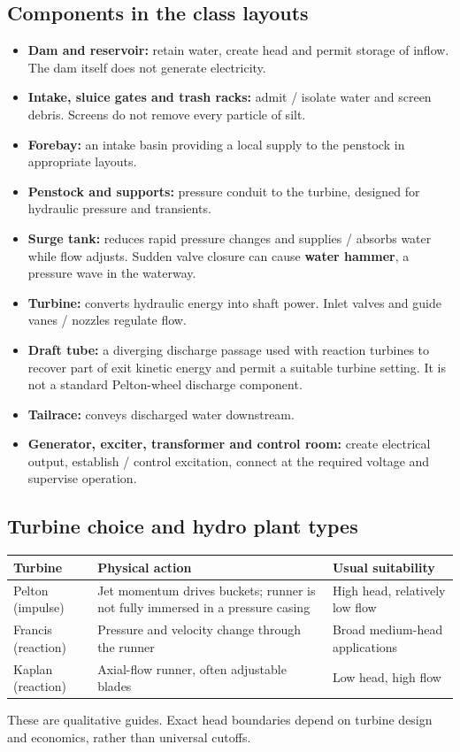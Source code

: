 \documentclass[11pt,a4paper]{article}
\begin{document}
\subsection{Components in the class layouts}
\begin{itemize}
\item \textbf{Dam and reservoir:} retain water, create head and permit storage of inflow. The dam itself does not generate electricity.
\item \textbf{Intake, sluice gates and trash racks:} admit / isolate water and screen debris. Screens do not remove every particle of silt.
\item \textbf{Forebay:} an intake basin providing a local supply to the penstock in appropriate layouts.
\item \textbf{Penstock and supports:} pressure conduit to the turbine, designed for hydraulic pressure and transients.
\item \textbf{Surge tank:} reduces rapid pressure changes and supplies / absorbs water while flow adjusts. Sudden valve closure can cause \textbf{water hammer}, a pressure wave in the waterway.
\item \textbf{Turbine:} converts hydraulic energy into shaft power. Inlet valves and guide vanes / nozzles regulate flow.
\item \textbf{Draft tube:} a diverging discharge passage used with reaction turbines to recover part of exit kinetic energy and permit a suitable turbine setting. It is not a standard Pelton-wheel discharge component.
\item \textbf{Tailrace:} conveys discharged water downstream.
\item \textbf{Generator, exciter, transformer and control room:} create electrical output, establish / control excitation, connect at the required voltage and supervise operation.
\end{itemize}

\subsection{Turbine choice and hydro plant types}
\begin{center}\small
\begin{tabularx}{\textwidth}{L{3cm}YY}
\toprule\textbf{Turbine} & \textbf{Physical action} & \textbf{Usual suitability}\\\midrule
Pelton (impulse) & Jet momentum drives buckets; runner is not fully immersed in a pressure casing & High head, relatively low flow\\
Francis (reaction) & Pressure and velocity change through the runner & Broad medium-head applications\\
Kaplan (reaction) & Axial-flow runner, often adjustable blades & Low head, high flow\\\bottomrule
\end{tabularx}\end{center}
These are qualitative guides. Exact head boundaries depend on turbine design and economics, rather than universal cutoffs.
\end{document}
